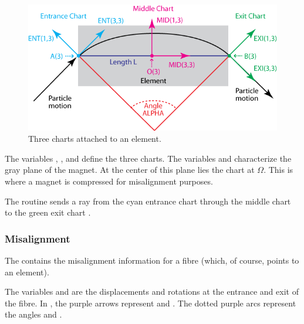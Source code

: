 \begin{figure}[ht]
  \centering
  \includegraphics{illustrations/charts-for-element}
  \caption{Three charts attached to an element.}
  \label{fig:Charts-for-element}
\end{figure}


The variables , , and  define the three charts. The variables  and  characterize the gray plane of the magnet. At the center of this plane lies the chart at $\Omega$. This is where a magnet is compressed for misalignment purposes.

The  routine sends a ray from the cyan entrance chart
 through the middle chart  to the green exit
chart .


\subsubsection{Misalignment}

The  contains the misalignment information for a fibre (which,
of course, points to an element).

The variables  and  are
the displacements and rotations at the entrance and exit of the fibre.
In , the purple arrows represent
 and . The dotted purple arcs represent the angles
 and .

